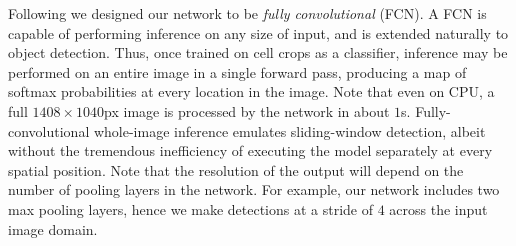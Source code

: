 Following \cite{sermanet2013overfeat} we designed our network to be \emph{fully convolutional} (FCN). A FCN is capable of performing inference on any size of input, and is extended naturally to object detection. Thus, once trained on cell crops as a classifier, inference may be performed on an entire image in a single forward pass, producing a map of softmax probabilities at every location in the image. Note that even on CPU, a full $1408 \times 1040$px image is processed by the network in about $1$s.  Fully-convolutional whole-image inference emulates sliding-window detection, albeit without the tremendous inefficiency of executing the model separately at every spatial position. Note that the resolution of the output will depend on the number of pooling layers in the network. For example, our network includes two max pooling layers, hence we make detections at a stride of $4$ across the input image domain.




